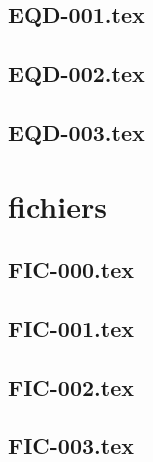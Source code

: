 \subsection*{\xxexo} 
\graphicspath{{../../exos/equadiffs/EQD-000/}}
 
 
\renewcommand{\xxexo}{EQD-001.tex} 
\subsection*{\xxexo} 
\graphicspath{{../../exos/equadiffs/EQD-001/}}
 
 
\renewcommand{\xxexo}{EQD-002.tex} 
\subsection*{\xxexo} 
\graphicspath{{../../exos/equadiffs/EQD-002/}}
 
 
\renewcommand{\xxexo}{EQD-003.tex} 
\subsection*{\xxexo} 
\graphicspath{{../../exos/equadiffs/EQD-003/}}
 
 
\section*{fichiers}
\renewcommand{\xxexo}{FIC-000.tex} 
\subsection*{\xxexo} 
\graphicspath{{../../exos/fichiers/FIC-000/}}
 
 
\renewcommand{\xxexo}{FIC-001.tex} 
\subsection*{\xxexo} 
\graphicspath{{../../exos/fichiers/FIC-001/}}
 
 
\renewcommand{\xxexo}{FIC-002.tex} 
\subsection*{\xxexo} 
\graphicspath{{../../exos/fichiers/FIC-002/}}
 
 
\renewcommand{\xxexo}{FIC-003.tex} 
\subsection*{\xxexo} 
\graphicspath{{../../exos/fichiers/FIC-003/}}
 
 
